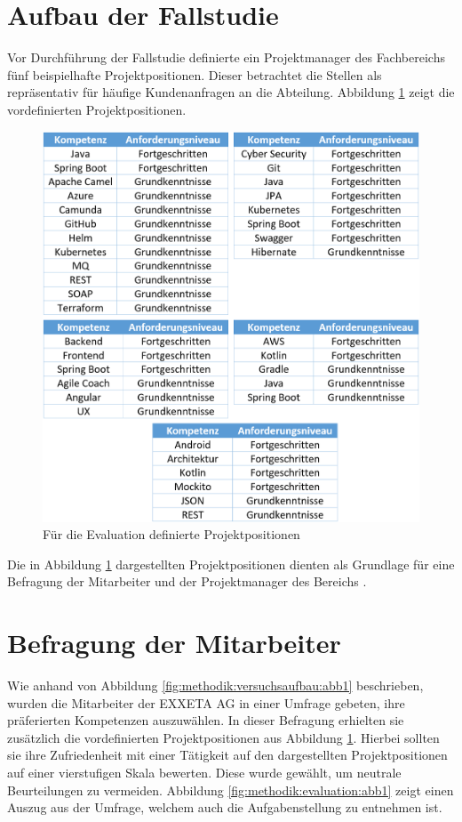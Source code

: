 \section{Aufbau der Fallstudie}
\label{ch:methodik:evaluation}
Vor Durchführung der Fallstudie definierte ein Projektmanager des Fachbereichs \JES fünf beispielhafte Projektpositionen. Dieser betrachtet die Stellen als repräsentativ für häufige Kundenanfragen an die Abteilung. Abbildung \ref{fig:methodik:evaluation:abb2} zeigt die vordefinierten Projektpositionen.

\begin{figure}[h]
	\centering
	\includegraphics[width=1.0\textwidth]{gfx/Projekt.png}
	\caption{Für die Evaluation definierte Projektpositionen}
	\label{fig:methodik:evaluation:abb2}
\end{figure}

Die in Abbildung \ref{fig:methodik:evaluation:abb2} dargestellten Projektpositionen dienten als Grundlage für eine Befragung der Mitarbeiter und der Projektmanager des Bereichs \JES.

\section{Befragung der Mitarbeiter}
\label{ch:methodik:evaluation:mitarbeiter}
Wie anhand von Abbildung \ref{fig:methodik:versuchsaufbau:abb1} beschrieben, wurden die Mitarbeiter der EXXETA AG in einer Umfrage gebeten, ihre präferierten Kompetenzen auszuwählen. In dieser Befragung erhielten sie zusätzlich die vordefinierten Projektpositionen aus Abbildung \ref{fig:methodik:evaluation:abb2}. Hierbei sollten sie ihre Zufriedenheit mit einer Tätigkeit auf den dargestellten Projektpositionen auf einer vierstufigen Skala bewerten. Diese wurde gewählt, um neutrale Beurteilungen zu vermeiden. Abbildung \ref{fig:methodik:evaluation:abb1} zeigt einen Auszug aus der Umfrage, welchem auch die Aufgabenstellung zu entnehmen ist.

